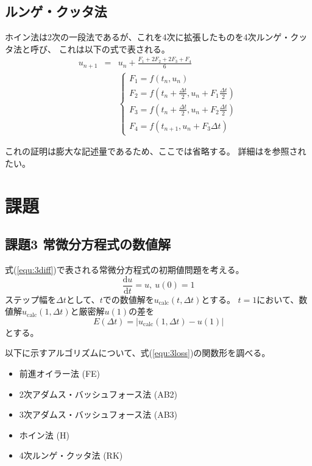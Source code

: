 \documentclass[a4j, titlepage]{jsarticle}
\numberwithin{equation}{section}
\begin{document}
    \subsection{ルンゲ・クッタ法}
        ホイン法は2次の一段法であるが、これを4次に拡張したものを4次ルンゲ・クッタ法と呼び、
        これは以下の式で表される。
        \begin{eqnarray}
            u_{n+1} &=& u_n + \frac{F_1 + 2F_2 + 2F_3 + F_4}{6} \\
            &&\begin{cases}
                F_1 = f(t_n, u_n) \\
                F_2 = \displaystyle f(t_n + \frac{\Delta t}{2}, u_n + F_1\frac{\Delta t}{2}) \\
                F_3 = \displaystyle f(t_n + \frac{\Delta t}{2}, u_n + F_2\frac{\Delta t}{2}) \\
                F_4 = f(t_{n+1}, u_n + F_3\Delta t)
            \end{cases}
        \end{eqnarray}

        これの証明は膨大な記述量であるため、ここでは省略する。
        詳細は\cite{runge}を参照されたい。

\section{課題}
    \subsection{課題3 常微分方程式の数値解}
        式(\ref{equ:3diff})で表される常微分方程式の初期値問題を考える。
        \begin{equation}
            \frac{\mathrm{d}u}{\mathrm{d}t}=u, \ u(0)=1 \label{equ:3diff}
        \end{equation}
        ステップ幅を$\Delta t$として、$t$での数値解を$u_\mathrm{calc}(t, \Delta t)$とする。
        $t=1$において、数値解$u_\mathrm{calc}(1, \Delta t)$と厳密解$u(1)$の差を
        \begin{equation}
            E(\Delta t) = |u_\mathrm{calc}(1, \Delta t) - u(1)| \label{equ:3loss}
        \end{equation}
        とする。

        以下に示すアルゴリズムについて、式(\ref{equ:3loss})の関数形を調べる。
        \begin{itemize}
            \item 前進オイラー法 (FE)
            \item 2次アダムス・バッシュフォース法 (AB2)
            \item 3次アダムス・バッシュフォース法 (AB3)
            \item ホイン法 (H)
            \item 4次ルンゲ・クッタ法 (RK)
        \end{itemize}
\end{document}
